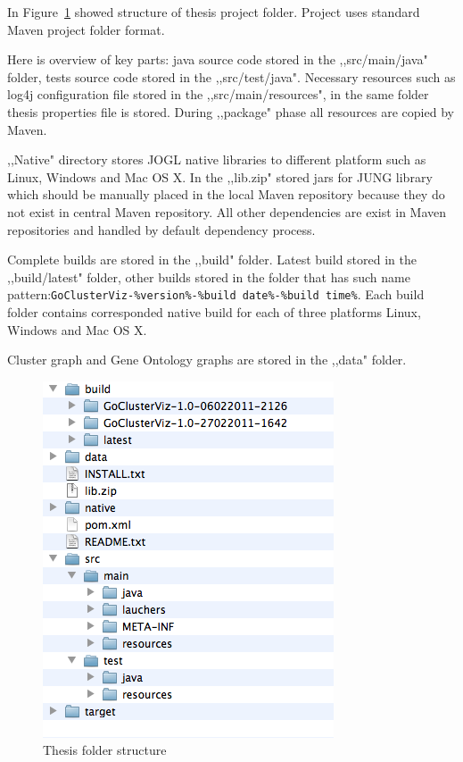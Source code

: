 In Figure~\ref{fig:THESIS_FOLDER_STRUCTURE} showed structure of thesis project folder. Project uses standard Maven project folder format.


Here is overview of key parts: java source code stored in the ,,src/main/java" folder, tests source code stored in the ,,src/test/java". Necessary resources such as log4j configuration file stored in the ,,src/main/resources", in the same folder thesis properties file is stored. During ,,package" phase all resources are copied by Maven.


,,Native" directory stores JOGL native libraries to different platform such as Linux, Windows and Mac OS X. In the ,,lib.zip" stored jars for JUNG library which should be manually placed in the local Maven repository because they do not  exist in central Maven repository. All other dependencies are exist in Maven repositories and handled by default dependency process.


Complete builds are stored in the ,,build" folder. Latest build stored in the ,,build/latest" folder, other builds stored in the folder that has such name pattern:\texttt{GoClusterViz-\%version\%-\%build date\%-\%build time\%}. Each build folder contains corresponded native build for each of three platforms Linux, Windows and Mac OS X.


Cluster graph and Gene Ontology graphs are stored in the ,,data" folder.

\begin{figure}[h!]
\centering
\includegraphics[scale=0.6]{pictures/thesis_folder_structure.png}
\caption{Thesis folder structure}
\label{fig:THESIS_FOLDER_STRUCTURE}
\end{figure}

